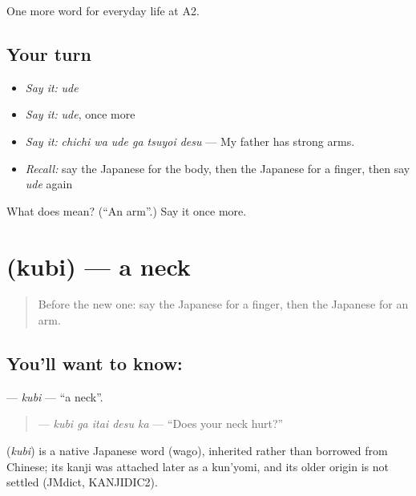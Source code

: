 \begin{grammarlens}[title={What you've built}]
One more word for everyday life at A2.
\end{grammarlens}

\subsection*{Your turn}
\begin{itemize}
\raggedright
  \item \emph{Say it:} \emph{ude}
  \item \emph{Say it:} \emph{ude}, once more
  \item \emph{Say it:} \emph{chichi wa ude ga tsuyoi desu} — My father has strong arms.
  \item \emph{Recall:} say the Japanese for the body, then the Japanese for a finger, then say \emph{ude} again
\end{itemize}

\begin{tcolorbox}[breakable,colback=teal!4,colframe=teal!35!black,title={Before you move on}]
What does  mean? (\textquotedblleft{}An arm\textquotedblright{}.) Say it once more.
\end{tcolorbox}
\section[\texorpdfstring{\ja{くび} (kubi)}{くび (kubi)}]{ (kubi) — a neck}

\label{lesson:JA-C215-kubi}



\begin{quote}
Before the new one: say the Japanese for a finger, then the Japanese for an arm.
\end{quote}

\subsection*{You'll want to know: }
\textbf{} — \emph{kubi} — \textquotedblleft{}a neck\textquotedblright{}.

\begin{quote}
\textbf{ } — \emph{kubi ga itai desu ka} — \textquotedblleft{}Does your neck hurt?\textquotedblright{}
\end{quote}

\begin{cousinweb}
\textbf{} (\emph{kubi}) is a native Japanese word (wago), inherited rather than borrowed from Chinese; its kanji was attached later as a kun'yomi, and its older origin is not settled (JMdict, KANJIDIC2).
\end{cousinweb}

